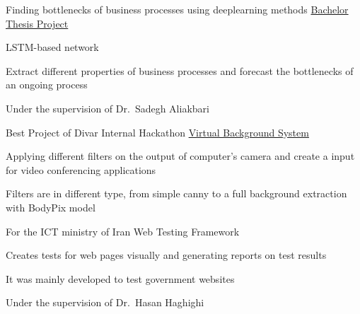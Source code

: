 


\begin{cventries}


\cventry
{Finding bottlenecks of business processes using deeplearning methods} %
{\href{https://github.com/mory91/bthesis}{Bachelor Thesis Project}} %
{} %
{} %
{ %
\begin{cvitems}
\item {LSTM-based network}
\item {Extract different properties of business processes and forecast the bottlenecks of an ongoing process}
\item {Under the supervision of Dr.~Sadegh Aliakbari}
\end{cvitems}
}

\cventry
{Best Project of Divar Internal Hackathon} %
{\href{https://github.com/mory91/vbs}{Virtual Background System}} %
{} %
{} %
{ %
\begin{cvitems}
\item {Applying different filters on the output of computer's camera and create a input for video conferencing applications}
\item {Filters are in different type, from simple canny to a full background extraction with BodyPix model}
\end{cvitems}
}

\cventry
{For the ICT ministry of Iran} %
{Web Testing Framework} %
{} %
{} %
{ %
\begin{cvitems}
\item {Creates tests for web pages visually and generating reports on test results}
\item {It was mainly developed to test government websites}
\item {Under the supervision of Dr.~Hasan Haghighi}
\end{cvitems}
}


\end{cventries}
